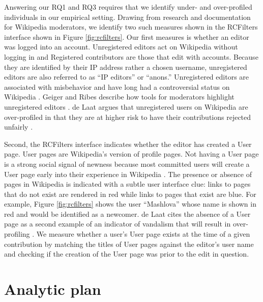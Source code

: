 \documentclass[format=acmsmall, natbib=true,  screen=true]{acmart}
\begin{document}
\label{sec:signal}
Answering our RQ1 and RQ3 requires that we identify under- and over-profiled individuals in our empirical setting. Drawing from research and documentation for Wikipedia moderators, we identify two such measures shown in the RCFilters interface shown in Figure \ref{fig:rcfilters}. 
Our first measures is whether an editor was logged into an account. Unregistered editors act on Wikipedia without logging in and Registered contributors are those that edit with accounts. Because they are identified by their IP address rather a chosen username, unregistered editors are also referred to as ``IP editors'' or ``anons.'' Unregistered editors are associated with misbehavior and have long had a controversial status on Wikipedia \cite{mcdonald_privacy_2019}. Geiger and Ribes describe how tools for moderators highlight unregistered editors \cite{geiger_work_2010}.
de Laat argues that unregistered users on Wikipedia are over-profiled in that they are at higher risk to have their contributions rejected unfairly \citep{de_laat_use_2015, de_laat_profiling_2016}.


Second, the RCFilters interface indicates whether the editor has created a User page. User pages are Wikipedia's version of profile pages. Not having a User page is a strong social signal of newness because most committed users will create a User page early into their experience in Wikipedia \cite{ayers_how_2008}. The presence or absence of pages in Wikipedia is indicated with a subtle user interface clue: links to pages that do not exist are rendered in red while links to pages that exist are blue. For example, Figure \ref{fig:rcfilters} shows the user ``Mashlova'' whose name is shown in red and would be identified as a newcomer.
de Laat cites the absence of a User page as a second example of an indicator of vandalism that will result in over-profiling \cite{de_laat_profiling_2016}. 
We measure whether a user's User page exists at the time of a given contribution by matching the titles of User pages against the editor's user name and checking if the creation of the User page was prior to the edit in question.  


\section{Analytic plan}
\label{sec:analytic}
 
\end{document}
